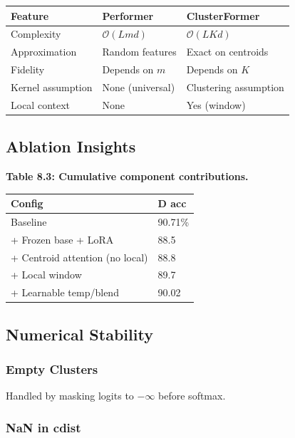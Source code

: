 \begin{table}[H]
\centering
\small
\begin{tabular}{lll}
\toprule
\textbf{Feature} & \textbf{Performer} & \textbf{ClusterFormer} \\
\midrule
Complexity & $\mathcal{O}(L m d)$ & $\mathcal{O}(L K d)$ \\
Approximation & Random features & Exact on centroids \\
Fidelity & Depends on $m$ & Depends on $K$ \\
Kernel assumption & None (universal) & Clustering assumption \\
Local context & None & Yes (window) \\
\bottomrule
\end{tabular}
\end{table}

\subsection{Ablation Insights}

\textbf{Table 8.3: Cumulative component contributions.}

\begin{table}[H]
\centering
\small
\begin{tabular}{ll}
\toprule
\textbf{Config} & \textbf{D acc} \\
\midrule
Baseline & 90.71\% \\
+ Frozen base + LoRA & 88.5 \\
+ Centroid attention (no local) & 88.8 \\
+ Local window & 89.7 \\
+ Learnable temp/blend & 90.02 \\
\bottomrule
\end{tabular}
\end{table}

\subsection{Numerical Stability}

\subsubsection{Empty Clusters}

Handled by masking logits to $-\infty$ before softmax.

\subsubsection{NaN in cdist}

